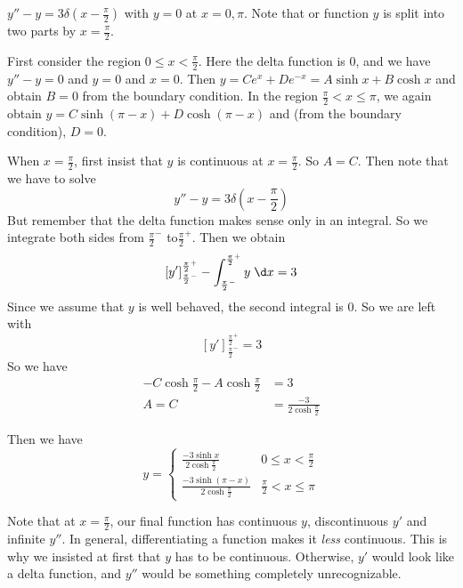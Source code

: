 \documentclass[a4paper]{article}
\begin{document}
\begin{eg}
  $y'' - y = 3\delta(x - \frac{\pi}{2})$ with $y = 0$ at $x = 0, \pi$. Note that or function $y$ is split into two parts by $x = \frac{\pi}{2}$.

  First consider the region $0 \leq x < \frac{\pi}{2}$. Here the delta function is $0$, and we have $y'' - y = 0$ and $y = 0$ and $x = 0$. Then $y = Ce^x + De^{-x} = A\sinh x + B\cosh x$ and obtain $B = 0$ from the boundary condition.
  In the region $\frac{\pi}{2} < x \leq \pi$, we again obtain $y = C\sinh(\pi - x) + D\cosh (\pi - x)$ and (from the boundary condition), $D = 0$.

  When $x = \frac{\pi}{2}$, first insist that $y$ is continuous at $x = \frac{\pi}{2}$. So $A = C$. Then note that we have to solve
  \[
    y'' - y = 3\delta\left(x - \frac{\pi}{2}\right)
  \]
  But remember that the delta function makes sense only in an integral. So we integrate both sides from $\frac{\pi}{2}^-$ to$\frac{\pi}{2}^+$. Then we obtain
  \[
    [y']^{\frac{\pi}{2}^+}_{\frac{\pi}{2}^-} - \int_{\frac{\pi}{2}^-}^{\frac{\pi}{2}^+} y\;\d x= 3
  \]
  Since we assume that $y$ is well behaved, the second integral is 0. So we are left with
  \[
    [y']^{\frac{\pi}{2}^+}_{\frac{\pi}{2}^-} = 3
  \]
  So we have
  \begin{align*}
    -C\cosh \frac{\pi}{2} - A\cosh\frac{\pi}{2} &= 3\\
    A = C &= \frac{-3}{2\cosh \frac{\pi}{2}}
  \end{align*}
\end{eg}
Then we have
\[
  y =
  \begin{cases}
    \frac{-3\sinh x}{2\cosh \frac{\pi}{2}} & 0 \leq x < \frac{\pi}{2}\\
    \frac{-3\sinh(\pi - x)}{2\cosh \frac{\pi}{2}} & \frac{\pi}{2} < x \leq \pi
  \end{cases}
\]
\begin{center}
\end{center}
Note that at $x = \frac{\pi}{2}$, our final function has continuous $y$, discontinuous $y'$ and infinite $y''$. In general, differentiating a function makes it \emph{less} continuous. This is why we insisted at first that $y$ has to be continuous. Otherwise, $y'$ would look like a delta function, and $y''$ would be something completely unrecognizable.
\end{document}
